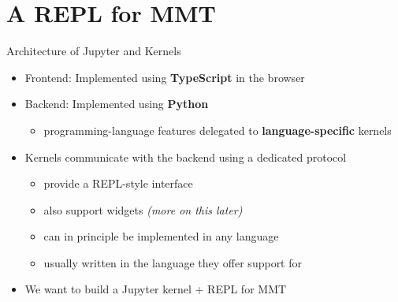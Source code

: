 \documentclass{beamer}
\begin{document}
    \section{A REPL for MMT}

    \begin{frame}{Architecture of Jupyter and Kernels}
        \begin{itemize}
            \item Frontend: Implemented using \textbf{TypeScript} in the browser
            \item Backend: Implemented using \textbf{Python}
            \begin{itemize}
                \item programming-language features delegated to \textbf{language-specific} kernels
            \end{itemize}
            \item Kernels communicate with the backend using a dedicated protocol
            \begin{itemize}
                \item provide a REPL-style interface
                \item also support widgets \textit{(more on this later)}
                \item can in principle be implemented in any language
                \item usually written in the language they offer support for
            \end{itemize}
            \item We want to build a Jupyter kernel + REPL for MMT
        \end{itemize}
    \end{frame}
\end{document}
